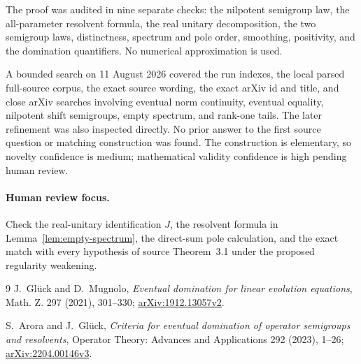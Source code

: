 \documentclass[11pt]{article}
\begin{document}
The proof was audited in nine separate checks: the nilpotent semigroup law,
the all-parameter resolvent formula, the real unitary decomposition, the two
semigroup laws, distinctness, spectrum and pole order, smoothing, positivity,
and the domination quantifiers.  No numerical approximation is used.

A bounded search on 11 August 2026 covered the run indexes, the local parsed
full-source corpus, the exact source wording, the exact arXiv id and title,
and close arXiv searches involving eventual norm continuity, eventual
equality, nilpotent shift semigroups, empty spectrum, and rank-one tails.  The
later refinement \cite{AroraGlueck2023} was also inspected directly.  No prior
answer to the first source question or matching construction was found.  The
construction is elementary, so novelty confidence is medium; mathematical
validity confidence is high pending human review.

\paragraph{Human review focus.}
Check the real-unitary identification $J$, the resolvent formula in
Lemma~\ref{lem:empty-spectrum}, the direct-sum pole calculation, and the exact
match with every hypothesis of source Theorem~3.1 under the proposed
regularity weakening.

\begin{thebibliography}{9}
J.~Gl\"uck and D.~Mugnolo,
\emph{Eventual domination for linear evolution equations},
Math. Z. 297 (2021), 301--330;
\href{https://arxiv.org/abs/1912.13057}{arXiv:1912.13057v2}.

S.~Arora and J.~Gl\"uck,
\emph{Criteria for eventual domination of operator semigroups and resolvents},
Operator Theory: Advances and Applications 292 (2023), 1--26;
\href{https://arxiv.org/abs/2204.00146}{arXiv:2204.00146v3}.
\end{thebibliography}
\end{document}
